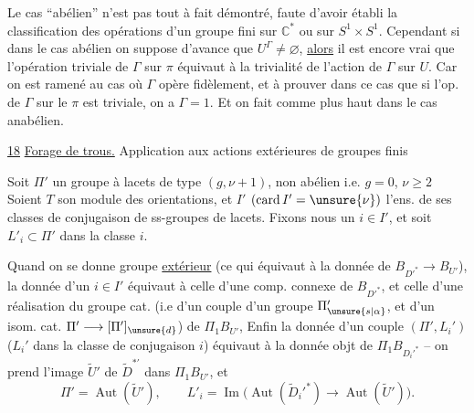 \uline{} Le cas ``abélien'' n'est pas tout à fait démontré, faute d'avoir établi la  classification  des opérations d'un groupe fini sur \(\mathbb C^{*}\) ou sur \(S^1\times S^1\). Cependant si dans le cas abélien on suppose d'avance que \(U^\Gamma\ne\varnothing\), \uline{alors}  il est encore vrai que l'opération triviale de \(\Gamma\) sur \(\pi\) équivaut à la trivialité de l'action de \(\Gamma\) sur \(U\). Car on est ramené au cas où \(\Gamma\) opère fidèlement, et à prouver dans ce cas que si l'op. de \(\Gamma\) sur le \(\pi\) est triviale, on a \(\Gamma=1\). Et on fait comme plus haut dans le cas anabélien.

\uline{18} \uline{Forage de trous.} Application aux actions extérieures de groupes finis

Soit \(\Pi'\) un groupe à lacets de type \((g,\nu+1)\), non abélien i.e.   \(g=0\),  \(\nu\ge2\)
Soient \(T\) son module des orientations, et \(I'\) \((\operatorname{card}I'=\unsure{\nu})\) l'ens. de ses classes de conjugaison de ss-groupes de lacets. Fixons nous un \(i\in I'\), et soit \(L'_i\subset\Pi'\) dans la classe \(i\).

Quand on se donne   groupe \uline{extérieur}  (ce qui  équivaut à la donnée de \(B_{D'^*}\longrightarrow B_{U'}\)), la donnée d'un  \(i\in I'\) équivaut à celle d'une comp. connexe de \(B_{D'^*}\), et celle d'une réalisation  du groupe cat. (i.e d'un couple d'un groupe \(\Pi'_{\unsure{s|\alpha}}\), et d'un isom. cat. \(\Pi'\longrightarrow[\Pi']_{\unsure{d}}\))   de \(\Pi_1B_{U'}\), Enfin la donnée d'un couple \((\Pi',L_i')\) (\(L_i'\) dans la classe de conjugaison \(i\)) équivaut  à la donnée  objt  de \(\Pi_1B_{D_i'^*}\) -- on prend l'image \(\widetilde U'\) de \(\widetilde D^{*'}\) dans \(\Pi_1B_{U'}\), et
\[
\Pi'=\operatorname{Aut}(\widetilde U'),\qquad
L'_i=\operatorname{Im}\bigl(\operatorname{Aut}(\widetilde D_i'^*)\longrightarrow
\operatorname{Aut}(\widetilde U')\bigr).
\]

